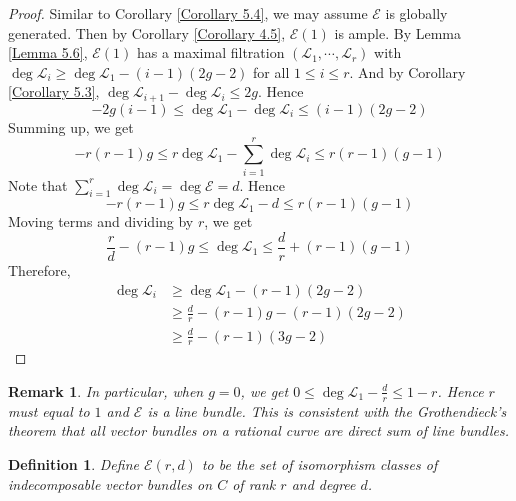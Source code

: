 \documentclass{ctexart}
\newtheorem{definition}{Definition}[section]
\newtheorem{remark}{Remark}[section]
\begin{document}
\begin{proof}
    Similar to Corollary \ref{Corollary 5.4}, we may assume $\mathcal{E}$ is globally generated.
    Then by Corollary \ref{Corollary 4.5}, $\mathcal{E}(1)$ is ample.
    By Lemma \ref{Lemma 5.6}, $\mathcal{E}(1)$ has a maximal filtration $(\mathcal{L}_{1}, \cdots, \mathcal{L}_{r})$ with $\deg \mathcal{L}_{i} \ge \deg \mathcal{L}_{1} - (i - 1)(2g - 2)$ for all $1 \le i \le r$.
    And by Corollary \ref{Corollary 5.3}, $\deg \mathcal{L}_{i + 1} - \deg \mathcal{L}_{i} \le 2g$.
    Hence
    \begin{equation}
        -2g(i - 1) \le \deg \mathcal{L}_{1} - \deg \mathcal{L}_{i} \le (i - 1)(2g - 2)
    \end{equation}
    Summing up, we get
    \begin{equation}
        -r(r - 1)g \le r\deg \mathcal{L}_{1} - \sum_{i = 1}^{r} \deg \mathcal{L}_{i} \le r(r - 1)(g - 1)
    \end{equation}
    Note that $\sum_{i = 1}^{r} \deg \mathcal{L}_{i} = \deg \mathcal{E} = d$.
    Hence
    \begin{equation}
        -r(r - 1)g \le r\deg \mathcal{L}_{1} - d \le r(r - 1)(g - 1)
    \end{equation}
    Moving terms and dividing by $r$, we get
    \begin{equation}
        \frac{r}{d} - (r - 1)g \le \deg \mathcal{L}_{1} \le \frac{d}{r} + (r - 1)(g - 1)
    \end{equation}
    Therefore,
    \begin{equation}
        \begin{split}
            \deg \mathcal{L}_{i} & \ge \deg \mathcal{L}_{1} - (r - 1)(2g - 2) \\
            & \ge \frac{d}{r} - (r - 1)g - (r - 1)(2g - 2) \\
            & \ge \frac{d}{r} - (r - 1)(3g - 2)
        \end{split}
    \end{equation}
\end{proof}
\begin{remark}
    In particular, when $g = 0$, we get $0 \le \deg \mathcal{L}_{1} - \frac{d}{r} \le 1 - r$.
    Hence $r$ must equal to $1$ and $\mathcal{E}$ is a line bundle.
    This is consistent with the Grothendieck's theorem that all vector bundles on a rational curve are direct sum of line bundles.
\end{remark}
\begin{definition}
    Define $\mathcal{E}(r, d)$ to be the set of isomorphism classes of indecomposable vector bundles on $C$ of rank $r$ and degree $d$.
\end{definition}
\end{document}
